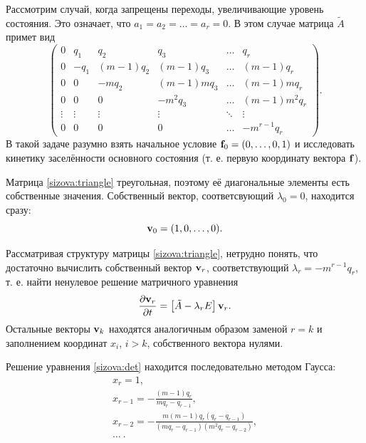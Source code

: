 \smallskip

 Рассмотрим случай, когда
запрещены переходы, увеличивающие уровень состояния. Это означает,
что $a_1 = a_2 = \ldots = a_r = 0$. В этом случае матрица $\tilde
A$ примет вид
\begin{equation}
\begin{pmatrix}
0 & q_1 &  q_2 & q_3 & \dots & q_r\\
0 & -q_1 & (m - 1) q_2 & (m - 1) q_3 & \ldots & (m - 1) q_r \\
0 & 0 & -mq_2 & (m - 1) m q_3 & \ldots & (m - 1) m q_r \\
0 & 0 & 0 & -m^2q_3 & \ldots & (m - 1) m^2 q_r \\
\vdots & \vdots & \vdots & \vdots & \ddots & \vdots \\
0 & 0 & 0 & 0 & \ldots & -m^{r - 1}q_r
\end{pmatrix}. \label{sizova:triangle}
\end{equation}
В такой задаче разумно взять начальное условие $\bold f_0 =
\left(0, \ldots, 0, 1\right)$ и исследовать кинетику заселённости
основного состояния (т. е. первую координату вектора $\bold f$).

Матрица \eqref{sizova:triangle} треугольная, поэтому её
диагональные элементы есть собственные значения. Собственный
вектор, соответсвующий $\lambda_0 = 0$, находится сразу:
$$
\bold v_0 = (1, 0, \ldots, 0).
$$

Рассматривая структуру матрицы \eqref{sizova:triangle}, нетрудно
понять, что достаточно вычислить собственный вектор $\bold v_r$,
соответствующий $\lambda_r = -m^{r - 1} q_r$, т. е. найти
ненулевое решение матричного уравнения
\begin{equation}
\frac{\partial \bold v_r}{\partial t} = \left[\tilde A - \lambda_r
E\right] \bold v_r. \label{sizova:det}
\end{equation}
Остальные векторы $\bold v_k$ находятся аналогичным образом
заменой $r = k$ и заполнением координат $x_i$, $i > k$,
собственного вектора нулями.

Решение уравнения \eqref{sizova:det} находится последовательно
методом Гаусса:
\begin{gather*}
x_r  = 1,\\
x_{r - 1} = -\frac{(m - 1) q_r}{mq_r - q_{r - 1}},\\
x_{r - 2} = -\frac{m (m - 1) q_r \left(q_r - q_{r -
1}\right)}{\left(mq_r - q_{r - 1}\right)\left(m^2q_r - q_{r -
2}\right)},\\
\ldots ~.
\end{gather*}

